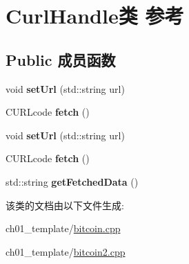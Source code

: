 \hypertarget{class_curl_handle}{}\section{Curl\+Handle类 参考}
\label{class_curl_handle}
\subsection*{Public 成员函数}
\begin{DoxyCompactItemize}
\item 
\mbox{\label{class_curl_handle_a90f37f06696c97f625b633d25251f1fb}} 
void {\bfseries set\+Url} (std\+::string url)
\item 
\mbox{\label{class_curl_handle_a0b085c24f4ca85b3daf25af15df3d663}} 
C\+U\+R\+Lcode {\bfseries fetch} ()
\item 
\mbox{\label{class_curl_handle_a90f37f06696c97f625b633d25251f1fb}} 
void {\bfseries set\+Url} (std\+::string url)
\item 
\mbox{\label{class_curl_handle_a0b085c24f4ca85b3daf25af15df3d663}} 
C\+U\+R\+Lcode {\bfseries fetch} ()
\item 
\mbox{\label{class_curl_handle_a7cd48bb1e6eba103c78a007d7f2c40b5}} 
std\+::string {\bfseries get\+Fetched\+Data} ()
\end{DoxyCompactItemize}


该类的文档由以下文件生成\+:\begin{DoxyCompactItemize}
\item 
ch01\+\_\+template/\mbox{\hyperlink{bitcoin_8cpp}{bitcoin.\+cpp}}\item 
ch01\+\_\+template/\mbox{\hyperlink{bitcoin2_8cpp}{bitcoin2.\+cpp}}\end{DoxyCompactItemize}
